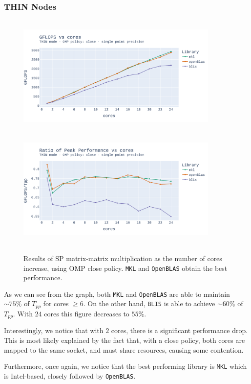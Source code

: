 \documentclass{report}
\begin{document}
\subsubsection{THIN Nodes}
\begin{figure}[H]
\hspace*{-2.5cm}
\includegraphics[width=10cm, height=6cm]{./images/fixed_size_thin_float_gflops_close.pdf}
\includegraphics[width=10cm, height=6cm]{./images/fixed_size_thin_float_gflops_close_ratio.pdf}
\caption{\label{fig:fixed_size_thin_float_close} Results of SP matrix-matrix 
    multiplication as the number of cores increase, using OMP close policy. 
    \texttt{MKL} and \texttt{OpenBLAS} obtain the best performance.}
\end{figure}

As we can see from the graph, both \texttt{MKL} and \texttt{OpenBLAS} are able 
to maintain $\sim 75\%$ of $T_{pp}$ for cores $\geq 6$. On the other 
hand, \texttt{BLIS} is able to achieve $\sim 60\%$ of $T_{pp}$. With $24$ cores 
this figure decreases to $55\%$. 

Interestingly, we notice that with $2$ cores, there is a significant performance 
drop. This is most likely explained by the fact that, with a close policy, both cores are mapped to the 
same socket, and must share resources, causing some contention.

Furthermore, once again, we notice that the best performing library is 
\texttt{MKL} which is Intel-based, closely followed by \texttt{OpenBLAS}.
\end{document}
